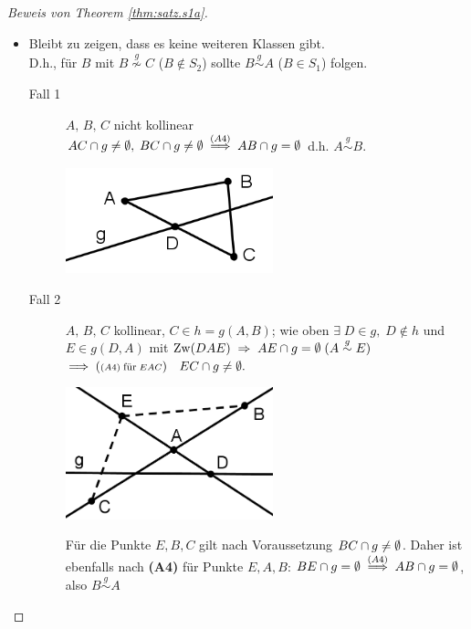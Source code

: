 \begin{proof}[Beweis von Theorem \ref{thm:satz.s1a}]
\begin{itemize}
        \item Bleibt zu zeigen, dass es keine weiteren Klassen gibt.\\
            D.h., für $B$ mit $B \stackrel{g}{\nsim} C$ ($B \notin S_2$) sollte $B
            \stackrel{g}{\sim} A$ ($B \in S_1$) folgen.


        \begin{description}
            \item[Fall 1] $A,\,B,\,C$ nicht kollinear\\
                ${AC} \cap g \neq \emptyset,\; {BC} \cap g \neq \emptyset\;
                \stackrel{(A4)}{\Longrightarrow}\; {AB} \cap g = \emptyset$ d.h. $A
                \stackrel{g}{\sim} B$.

                \centerline{\includegraphics[width=6cm]{BILDER/1-1-06e-Seiten.png}}

            \item[Fall 2] $A,\, B,\, C$ kollinear, $C \in h = g(A,B)$; wie oben $\exists\; D \in
                g,\; D \notin h$ und $E \in g(D,A)$ mit $\operatorname{Zw}(DAE)\; \Rightarrow\; {AE} \cap g =
                \emptyset\; (A \stackrel{g}{\sim} E)$\\ $\Longrightarrow\; ({\scriptstyle (A4)\;
                \mbox{\footnotesize für}\; EAC}) \quad {EC} \cap g \neq \emptyset.$

                \centerline{\includegraphics[width=6cm]{BILDER/1-1-06f-Seiten.png}}

                Für die Punkte $E, B, C$ gilt nach Voraussetzung ${BC} \cap g \neq \emptyset$.
                Daher ist ebenfalls nach \textbf{(A4)} für Punkte $E, A, B$: ${BE} \cap g =
                \emptyset \; \stackrel{(A4)}{\Longrightarrow}\; {AB} \cap g = \emptyset$, also
                $B \stackrel{g}{\sim} A$
        \end{description}
    \end{itemize}
\end{proof}

